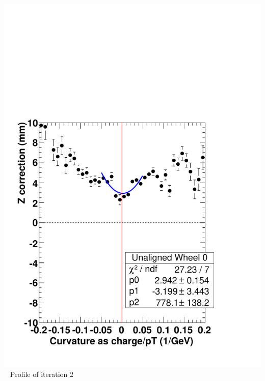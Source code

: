 \documentclass[compress]{beamer}
\begin{document}
\begin{frame}
\begin{columns}
\includegraphics[width=\linewidth]{ZvsCurvature_wh0_unaligned.pdf}
\mbox{ } \hfill Profile of iteration 2 \hfill \mbox{ }


\end{columns}
\end{frame}
\end{document}
